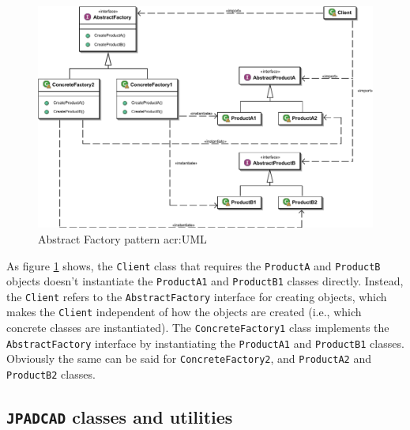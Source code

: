 %
\begin{figure}[H]
\centering
\includegraphics[scale=0.8]{Immagini/Capitolo2/Abstract_factory_UML}
\caption{Abstract Factory pattern \gls{acr:UML}}
\label{fig:AbstractFactoryUML}
\end{figure}
%
\noindent
As figure \ref{fig:AbstractFactoryUML} shows, the \texttt{Client} class that requires the \texttt{ProductA} and \texttt{ProductB} objects doesn't instantiate the \texttt{ProductA1} and \texttt{ProductB1} classes directly. Instead, the \texttt{Client} refers to the \texttt{AbstractFactory} interface for creating objects, which makes the \texttt{Client} independent of how the objects are created (i.e., which concrete classes are instantiated). The \texttt{ConcreteFactory1} class implements the \texttt{AbstractFactory} interface by instantiating the \texttt{ProductA1} and \texttt{ProductB1} classes. Obviously the same can be said for \texttt{ConcreteFactory2}, and \texttt{ProductA2} and \texttt{ProductB2} classes.

\subsection{\texttt{JPADCAD} classes and utilities}
\label{sec2.3.2}

